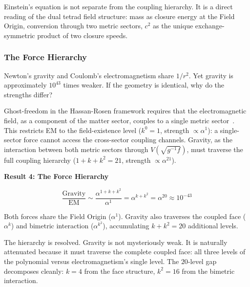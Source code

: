 \documentclass[aps,prd,preprint,superscriptaddress,showpacs,preprintnumbers,amsmath,amssymb,nofootinbib]{revtex4-2}
\begin{document}
Einstein's equation is not separate from the coupling hierarchy. It is a direct reading of the dual tetrad field structure: mass as closure energy at the Field Origin, conversion through two metric sectors, $c^2$ as the unique exchange-symmetric product of two closure speeds.

\subsubsection*{The Force Hierarchy}

Newton's gravity and Coulomb's electromagnetism share $1/r^2$. Yet gravity is approximately $10^{43}$ times weaker. If the geometry is identical, why do the strengths differ?

Ghost-freedom in the Hassan-Rosen framework requires that the electromagnetic field, as a component of the matter sector, couples to a single metric sector~\cite{hassan2012}. This restricts EM to the field-existence level ($k^0 = 1$, strength $\propto \alpha^1$): a single-sector force cannot access the cross-sector coupling channels. Gravity, as the interaction between both metric sectors through $V(\sqrt{g^{-1}f})$, must traverse the full coupling hierarchy ($1 + k + k^2 = 21$, strength $\propto \alpha^{21}$).

\vspace{1.5em}
\noindent
\colorbox{resultgreen}{\parbox{\dimexpr\textwidth-2\fboxsep\relax}{%
\vspace{0.8em}
\centering
\textbf{\large Result 4: The Force Hierarchy}

\vspace{0.5em}
\boldmath
\begin{equation}
\frac{\text{Gravity}}{\text{EM}} \sim \frac{\alpha^{1+k+k^2}}{\alpha^{1}} = \alpha^{k+k^2} = \alpha^{20} \approx 10^{-43}
\label{eq:force-hierarchy}
\end{equation}
\unboldmath

\vspace{0.3em}
Both forces share the Field Origin ($\alpha^1$). Gravity also traverses the coupled face ($\alpha^k$) and bimetric interaction ($\alpha^{k^2}$), accumulating $k + k^2 = 20$ additional levels.
\vspace{0.5em}
}}
\vspace{1cm}

The hierarchy is resolved. Gravity is not mysteriously weak. It is naturally attenuated because it must traverse the complete coupled face: all three levels of the polynomial versus electromagnetism's single level. The $20$-level gap decomposes cleanly: $k = 4$ from the face structure, $k^2 = 16$ from the bimetric interaction.
\end{document}
